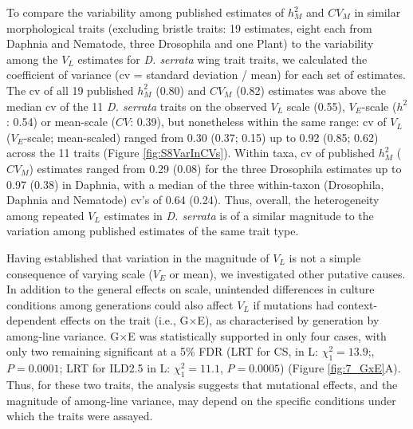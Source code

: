 To compare the variability among published estimates of $h_M^2$	and	$CV_M$ in similar morphological traits (excluding bristle traits: 19 estimates, eight each from Daphnia and Nematode, three Drosophila and one Plant) to the variability among the $V_L$ estimates for \textit{D. serrata} wing trait traits, we calculated	the coefficient of variance (cv = standard deviation / mean) for each set of estimates. The cv of all 19 published $h_M^2$ (0.80) and	$CV_M$ (0.82) estimates was above the median cv of the 11 \textit{D. serrata} traits on the observed $V_L$ scale (0.55), $V_E$-scale ($h^2$: 0.54) or mean-scale ($CV$: 0.39), but nonetheless within the same range: cv of $V_L$ ($V_E$-scale; mean-scaled) ranged from 0.30 (0.37; 0.15) up to 0.92 (0.85; 0.62) across the 11 traits (Figure \ref{fig:S8VarInCVs}). Within taxa, cv of published $h_M^2$ ($CV_M$) estimates	ranged from 0.29 (0.08) for the three Drosophila estimates up to 0.97 (0.38) in Daphnia, with a median of the three within-taxon (Drosophila, Daphnia and Nematode) cv’s of 0.64 (0.24). Thus, overall, the heterogeneity among repeated $V_L$ estimates in \textit{D. serrata} is of a similar magnitude to the variation among published estimates of the same trait type.\par

Having established that variation in the magnitude of $V_L$ is not a simple consequence of varying scale ($V_E$ or mean), we investigated other putative causes. In addition to the general effects on scale, unintended differences in culture conditions among generations could also affect $V_L$ if mutations had context-dependent effects on the trait (i.e., G$\times$E), as characterised by generation by among-line variance. G$\times$E was statistically supported in only four cases, with only two remaining significant at a 5\% FDR (LRT for CS, in L: $\chi^2_1 = 13.9$;, $P = 0.0001$; LRT for ILD2.5 in L: $\chi^2_1 = 11.1$, $P = 0.0005$) (Figure \ref{fig:7_GxE}A). Thus, for these two traits, the analysis suggests that mutational effects, and the magnitude of among-line variance, may depend on the specific conditions under which the traits were assayed. \par

